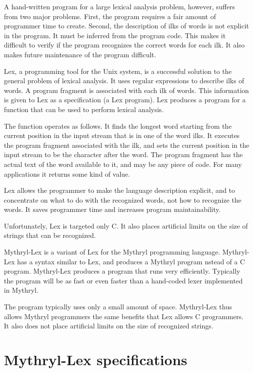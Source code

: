 A hand-written program for a large lexical analysis problem, however,
suffers from two major problems.  First, the program requires a fair
amount of programmer time to create.  Second, the description of
ilks of words is not explicit in the program.  It must be inferred
from the program code.  This makes it difficult to verify if the
program recognizes the correct words for each ilk.  It also makes
future maintenance of the program difficult.

Lex, a programming tool for the Unix system, is a successful solution
to the general problem of lexical analysis.  It uses regular
expressions to describe ilks of words.  A program fragment is
associated with each ilk of words.  This information is given to
Lex as a specification (a Lex program).  Lex produces a program for a
function that can be used to perform lexical analysis.

The function operates as follows.  It finds the longest word starting
from the current position in the input stream that is in one of the
word ilks.  It executes the program fragment associated with the
ilk, and sets the current position in the input stream to be the
character after the word.  The program fragment has the actual text
of the word available to it, and may be any piece of code.  For many
applications it returns some kind of value.

Lex allows the programmer to make the language description explicit,
and to concentrate on what to do with the recognized words, not how
to recognize the words.  It saves programmer time and increases
program maintainability.

Unfortunately, Lex is targeted only C.  It also places artificial 
limits on the size of strings that can be recognized.

Mythryl-Lex is a variant of Lex for the Mythryl programming language.
Mythryl-Lex has a syntax similar to Lex, and produces a Mythryl program 
nstead of a C program.  Mythryl-Lex produces a program that runs very efficiently.
Typically the program will be as fast or even faster than a
hand-coded lexer implemented in Mythryl.

The program typically uses only a small amount of space.
Mythryl-Lex thus allows Mythryl programmers the same benefits that Lex allows C
programmers.  It also does not place artificial limits on the size of
recognized strings.

\section{Mythryl-Lex specifications}

